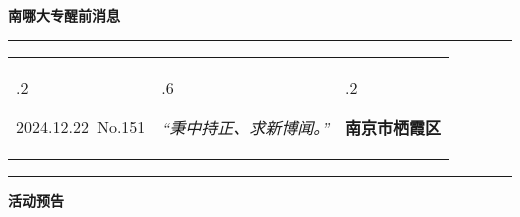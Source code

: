 \documentclass[letterpaper, 12pt]{article}
\begin{document}
\begin{center}
    \Huge\textbf{南哪大专醒前消息}
\end{center}
\vspace{4mm}
\hrule
\renewcommand\tabularxcolumn[1]{m{#1}}
\begin{tabularx}{\textwidth}{>{\hsize.2\hsize}X>{\hsize.6\hsize}X>{\hsize.2\hsize}X}
    \begin{flushleft}
        2024.12.22\, No.151
    \end{flushleft}
    &
    \begin{center}
        \textit{“秉中持正、求新博闻。”}
    \end{center}
    &
    \begin{flushright}
        \textbf{南京市栖霞区}
    \end{flushright}
\end{tabularx}
\vspace{-3.5mm}
\hrule
\vspace{4mm}
\centerline{\huge\textbf{活动预告}}
\end{document}

